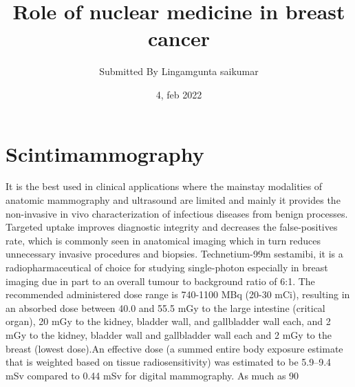\documentclass{article}
\title{Role of nuclear medicine in breast cancer}
\author{Submitted By Lingamgunta saikumar}
\date{4, feb 2022}
\begin{document}
\maketitle

\section{Scintimammography}
It is the best used in clinical applications where the mainstay modalities of anatomic mammography and ultrasound are limited and mainly it provides the non-invasive in vivo characterization of infectious diseases from benign processes. Targeted uptake improves diagnostic integrity and decreases the false-positives rate, which is commonly seen in anatomical imaging which in turn reduces unnecessary invasive procedures and biopsies. Technetium-99m sestamibi, it is a radiopharmaceutical of choice for studying single-photon especially in breast imaging due in part to an overall tumour to background ratio of 6:1. The recommended administered dose range is 740-1100 MBq (20-30 mCi), resulting in an absorbed dose between 40.0 and 55.5 mGy to the large intestine (critical organ), 20 mGy to the kidney, bladder wall, and gallbladder wall each, and 2 mGy to the kidney, bladder wall and gallbladder wall each and 2 mGy to the breast (lowest dose).An effective dose (a summed entire body exposure estimate that is weighted based on tissue radiosensitivity) was estimated to be 5.9–9.4 mSv compared to 0.44 mSv for digital mammography. As much as 90%
\end{document}
